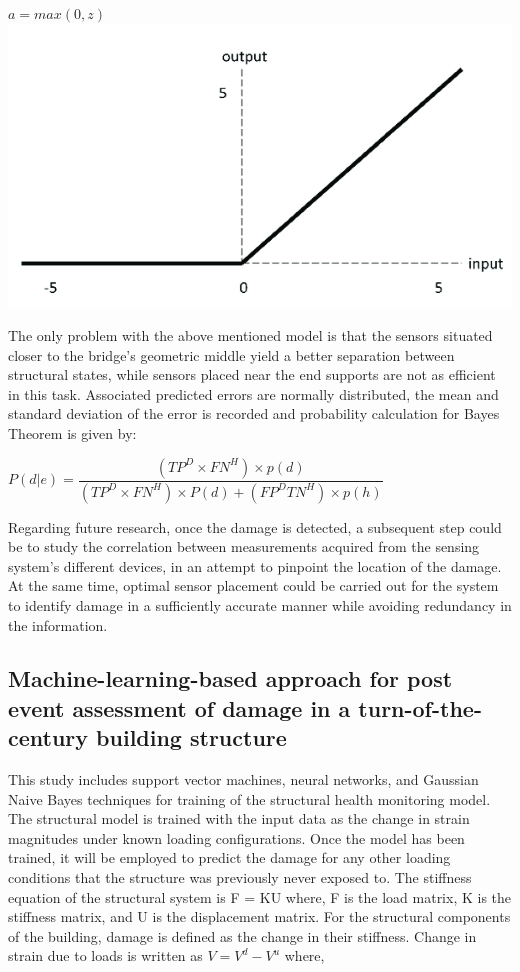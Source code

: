 \documentclass{article}
\begin{document}
\begin{center}
    $a=max(0,z)$
    \\
    \includegraphics[scale=0.35]{Images/ReLU-activation-function.png}

\end{center}

The only problem with the above mentioned model is that the sensors situated closer to the bridge's geometric middle yield a better separation between structural states, while sensors placed near the end supports are not as efficient in this task. Associated predicted errors are normally distributed, the mean and standard deviation of the error is recorded and probability calculation for Bayes Theorem is given by:

\begin{center}
    $P(d|e) = \dfrac{(TP^D \times FN^H) \times p(d)}{(TP^D \times FN^H) \times P(d) + (FP^D TN^H) \times p(h)}$
\end{center}

Regarding future research, once the damage is detected, a subsequent step could be to study the correlation between measurements acquired from the sensing system's different devices, in an attempt to pinpoint the location of the damage. At the same time, optimal sensor placement could be carried out for the system to identify damage in a sufficiently accurate manner while avoiding redundancy in the information.

\subsection{Machine-learning-based approach for post event assessment of damage in a turn-of-the-century building structure}
This study includes support vector machines, neural networks, and Gaussian Naive Bayes techniques for training of the structural health monitoring model. The structural model is trained with the input data as the change in strain magnitudes under known loading configurations. Once the model has been trained, it will be employed to predict the damage for any other loading conditions that the structure was previously never exposed to.  The stiffness equation of the structural system is F = KU where, F is the load matrix, K is the stiffness matrix, and U is the displacement matrix. For the structural components of the building,  damage is defined as the change in their stiffness.
Change in strain due to loads is written as $V= V^d-V^u$ where,
\end{document}
